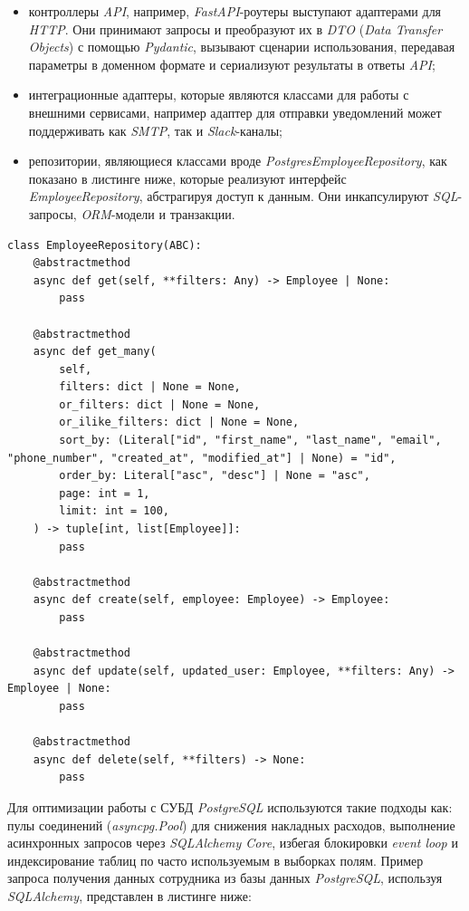 \begin{itemize}
    \item контроллеры \textit{API}, например, \textit{FastAPI}-роутеры выступают адаптерами для \textit{HTTP}. Они принимают запросы и преобразуют их в \textit{DTO} (\textit{Data Transfer Objects}) с помощью \textit{Pydantic}, вызывают сценарии использования, передавая параметры в доменном формате и сериализуют результаты в ответы \textit{API};
    \item интеграционные адаптеры, которые являются классами для работы с внешними сервисами, например адаптер для отправки уведомлений может поддерживать как \textit{SMTP}, так и \textit{Slack}-каналы;
    \item репозитории, являющиеся классами вроде \textit{Postgres\-Employee\-Re\-po\-si\-to\-ry}, как показано в листинге ниже, которые реализуют интерфейс \textit{Employee\-Re\-po\-si\-to\-ry}, абстрагируя доступ к данным. Они инкапсулируют \textit{SQL}-запросы, \textit{ORM}-модели и транзакции.
\end{itemize}

\begin{lstlisting}[style=pythonstyle]
class EmployeeRepository(ABC):
    @abstractmethod
    async def get(self, **filters: Any) -> Employee | None:
        pass

    @abstractmethod
    async def get_many(
        self,
        filters: dict | None = None,
        or_filters: dict | None = None,
        or_ilike_filters: dict | None = None,
        sort_by: (Literal["id", "first_name", "last_name", "email", "phone_number", "created_at", "modified_at"] | None) = "id",
        order_by: Literal["asc", "desc"] | None = "asc",
        page: int = 1,
        limit: int = 100,
    ) -> tuple[int, list[Employee]]:
        pass

    @abstractmethod
    async def create(self, employee: Employee) -> Employee:
        pass

    @abstractmethod
    async def update(self, updated_user: Employee, **filters: Any) -> Employee | None:
        pass

    @abstractmethod
    async def delete(self, **filters) -> None:
        pass
\end{lstlisting}

Для оптимизации работы с СУБД \textit{PostgreSQL} используются такие подходы как: пулы соединений (\textit{asyncpg.Pool}) для снижения накладных расходов, выполнение асинхронных запросов через \textit{SQLAlchemy Core}, избегая блокировки \textit{event loop} и индексирование таблиц по часто используемым в выборках полям. Пример запроса получения данных сотрудника из базы данных \textit{PostgreSQL}, используя \textit{SQLAlchemy}, представлен в листинге ниже:

